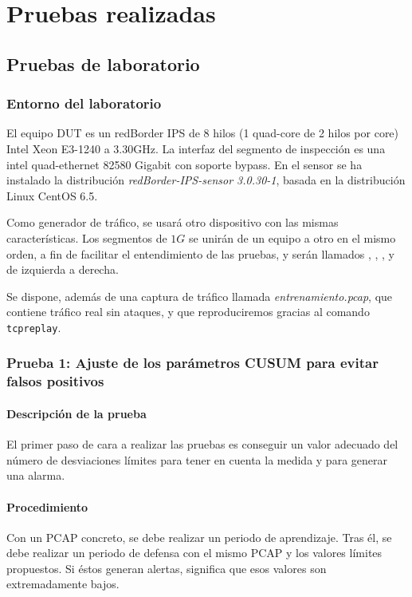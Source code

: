 \section{Pruebas realizadas}\label{sec:pruebas}
\subsection{Pruebas de laboratorio}
\subsubsection{Entorno del laboratorio}

El equipo \gls{DUT} es un redBorder IPS de 8 hilos (1 quad-core de 2 hilos por core) Intel Xeon E3-1240 a 3.30GHz. La 
interfaz del segmento de inspección es una intel quad-ethernet 82580 Gigabit con soporte bypass. En el sensor se ha 
instalado la distribución \emph{redBorder-IPS-sensor 3.0.30-1}, basada en la distribución Linux CentOS 6.5.

Como generador de tráfico, se usará otro dispositivo con las mismas características. Los segmentos de $1G$ se unirán de 
un equipo a otro en el mismo orden, a fin de facilitar el entendimiento de las pruebas, y serán llamados 
, , , y  de izquierda a derecha.

Se dispone, además de una captura de tráfico llamada \emph{entrenamiento.pcap}, que contiene tráfico real sin ataques,
y que reproduciremos gracias al comando \texttt{tcpreplay}.

\subsubsection{Prueba 1: Ajuste de los parámetros CUSUM para evitar falsos positivos}
\paragraph{Descripción de la prueba}\mbox{}

El primer paso de cara a realizar las pruebas es conseguir un valor adecuado del número de desviaciones límites
para tener en cuenta la medida y para generar una alarma.

\paragraph{Procedimiento}\mbox{}

Con un PCAP concreto, se debe realizar un periodo de aprendizaje. Tras él, se debe realizar un
periodo de defensa con el mismo PCAP y los valores límites propuestos. Si éstos generan alertas,
significa que esos valores son extremadamente bajos.

